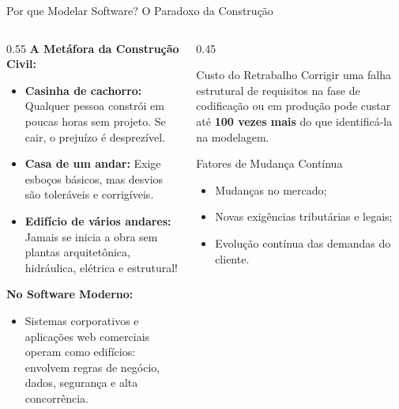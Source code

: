 \documentclass[10pt]{beamer}
\begin{document}
\begin{frame}{Por que Modelar Software? O Paradoxo da Construção}
    \begin{columns}
        \begin{column}{0.55\textwidth}
            \textbf{A Metáfora da Construção Civil:}
            \begin{itemize}
                \item \textbf{Casinha de cachorro:} Qualquer pessoa constrói em poucas horas sem projeto. Se cair, o prejuízo é desprezível.
                \item \textbf{Casa de um andar:} Exige esboços básicos, mas desvios são toleráveis e corrigíveis.
                \item \textbf{Edifício de vários andares:} Jamais se inicia a obra sem plantas arquitetônica, hidráulica, elétrica e estrutural!
            \end{itemize}
            \vspace{0.2cm}
            \textbf{No Software Moderno:}
            \begin{itemize}
                \item Sistemas corporativos e aplicações web comerciais operam como edifícios: envolvem regras de negócio, dados, segurança e alta concorrência.
            \end{itemize}
        \end{column}
        \begin{column}{0.45\textwidth}
            \begin{block}{Custo do Retrabalho}
                Corrigir uma falha estrutural de requisitos na fase de codificação ou em produção pode custar até \textbf{100 vezes mais} do que identificá-la na modelagem.
            \end{block}
            \vspace{0.2cm}
            \begin{exampleblock}{Fatores de Mudança Contínua}
                \begin{itemize}
                    \item Mudanças no mercado;
                    \item Novas exigências tributárias e legais;
                    \item Evolução contínua das demandas do cliente.
                \end{itemize}
            \end{exampleblock}
        \end{column}
    \end{columns}
\end{frame}
\end{document}
